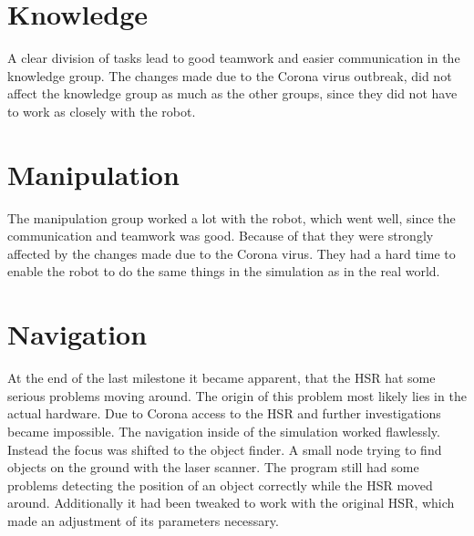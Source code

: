 \documentclass[main.tex]{subfiles}
\begin{document}
\section{Knowledge}

A clear division of tasks lead to good teamwork and easier communication in the knowledge group.
The changes made due to the Corona virus outbreak, did not affect the knowledge group as much as the other groups, since they did not have to work as closely with the robot.

\section{Manipulation}

The manipulation group worked a lot with the robot, which went well, since the communication and teamwork was good.
Because of that they were strongly affected by the changes made due to the Corona virus. They had a hard time to enable the robot to do the same things in the simulation as in the real world.

\section{Navigation}
At the end of the last milestone it became apparent, that the HSR hat some serious problems moving around. The origin of this problem most likely lies in the actual hardware. Due to Corona access to the HSR and further investigations became impossible. The navigation inside of the simulation worked flawlessly. Instead the focus was shifted to the object finder. A small node trying to find objects on the ground with the laser scanner. The program still had some problems detecting the position of an object correctly while the HSR moved around. Additionally it had been tweaked to work with the original HSR, which made an adjustment of its parameters necessary.  
\end{document}
